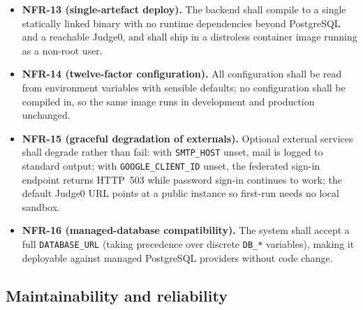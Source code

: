 \begin{itemize}[leftmargin=1.4em]
  \item \textbf{NFR-13 (single-artefact deploy).} The backend shall compile to a single
        statically linked binary with no runtime dependencies beyond PostgreSQL and a
        reachable Judge0, and shall ship in a distroless container image running as a
        non-root user.
  \item \textbf{NFR-14 (twelve-factor configuration).} All configuration shall be read
        from environment variables with sensible defaults; no configuration shall be
        compiled in, so the same image runs in development and production unchanged.
  \item \textbf{NFR-15 (graceful degradation of externals).} Optional external services
        shall degrade rather than fail: with \texttt{SMTP\_HOST} unset, mail is logged to
        standard output; with \texttt{GOOGLE\_CLIENT\_ID} unset, the federated sign-in
        endpoint returns HTTP~503 while password sign-in continues to work; the default
        Judge0 URL points at a public instance so first-run needs no local sandbox.
  \item \textbf{NFR-16 (managed-database compatibility).} The system shall accept a full
        \texttt{DATABASE\_URL} (taking precedence over discrete \texttt{DB\_*} variables),
        making it deployable against managed PostgreSQL providers without code change.
\end{itemize}

\subsection{Maintainability and reliability}
\label{sec:req-nfr-maint}

